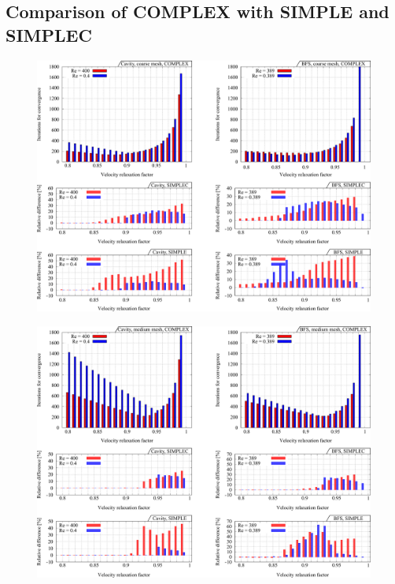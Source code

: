 \documentclass[final,3p,times,10pt,onecolumn]{myElsarticle}
\numberwithin{equation}{section}
\begin{document}
\subsection{Comparison of COMPLEX with SIMPLE and SIMPLEC}

\begin{figure}[h!]
\centering
\includegraphics[width=17cm]{fig/Results/complexCoarse.pdf}
\caption{}
\label{Fig:complexCoarse}
\end{figure}

\begin{figure}[h!]
\centering
\includegraphics[width=17cm]{fig/Results/complexMedium.pdf}
\caption{}
\label{Fig:complexMedium}
\end{figure}
\end{document}
